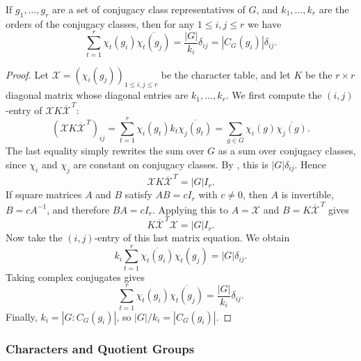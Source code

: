 \documentclass[../Odyssey_Project.tex]{subfiles}
\begin{document}
\begin{namedtheorem}
\label{thm:col-orthogonality}
If $g_1, \ldots, g_r$ are a set of conjugacy class representatives of $G$, and $k_1, \ldots, k_r$ are the orders of the conjugacy classes, then for any $1 \leq i, j \leq r$ we have
\[
    \sum_{t=1}^{r} \chi_t(g_i)\overline{\chi_t(g_j)} = \frac{|G|}{k_i}\delta_{ij} = |C_G(g_i)|\delta_{ij}.
\]
\end{namedtheorem}
\begin{proof}
    Let $\mathcal{X}=(\chi_i(g_j))_{1\leq i,j\leq r}$ be the character table, and let $K$ be the $r\times r$ diagonal matrix whose diagonal entries are $k_1,\ldots,k_r$. We first compute the $(i,j)$-entry of $\mathcal{X}K\overline{\mathcal{X}}^{\,T}$:
    \[
        (\mathcal{X}K\overline{\mathcal{X}}^{\,T})_{ij}
        =
        \sum_{t=1}^{r}\chi_i(g_t)k_t\overline{\chi_j(g_t)}
        =
        \sum_{g\in G}\chi_i(g)\overline{\chi_j(g)}.
    \]
    The last equality simply rewrites the sum over $G$ as a sum over conjugacy classes, since $\chi_i$ and $\chi_j$ are constant on conjugacy classes. By , this is $|G|\delta_{ij}$. Hence
    \[
        \mathcal{X}K\overline{\mathcal{X}}^{\,T}=|G|I_r.
    \]
    If square matrices $A$ and $B$ satisfy $AB=cI_r$ with $c\neq0$, then $A$ is invertible, $B=cA^{-1}$, and therefore $BA=cI_r$. Applying this to $A=\mathcal{X}$ and $B=K\overline{\mathcal{X}}^{\,T}$ gives
    \[
        K\overline{\mathcal{X}}^{\,T}\mathcal{X}=|G|I_r.
    \]
    Now take the $(i,j)$-entry of this last matrix equation. We obtain
    \[
        k_i\sum_{t=1}^{r}\overline{\chi_t(g_i)}\chi_t(g_j)=|G|\delta_{ij}.
    \]
    Taking complex conjugates gives
    \[
        \sum_{t=1}^{r}\chi_t(g_i)\overline{\chi_t(g_j)}
        =
        \frac{|G|}{k_i}\delta_{ij}.
    \]
    Finally, $k_i=|G:C_G(g_i)|$, so $|G|/k_i=|C_G(g_i)|$.
\end{proof}

\subsubsection*{Characters and Quotient Groups}
\end{document}

